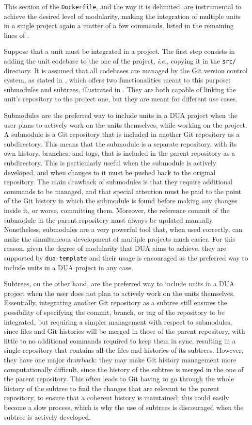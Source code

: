 This section of the \texttt{Dockerfile}, and the way it is delimited, are instrumental to achieve the desired level of modularity, making the integration of multiple units in a single project again a matter of a few commands, listed in the remaining lines of .

Suppose that a unit must be integrated in a project. The first step consists in adding the unit codebase to the one of the project, \emph{i.e.}, copying it in the \texttt{src/} directory. It is assumed that all codebases are managed by the Git version control system, as stated in , which offers two functionalities meant to this purpose: submodules and subtrees, illustrated in . They are both capable of linking the unit's repository to the project one, but they are meant for different use cases.

Submodules are the preferred way to include units in a DUA project when the user plans to actively work on the units themselves, while working on the project. A submodule is a Git repository that is included in another Git repository as a subdirectory. This means that the submodule is a separate repository, with its own history, branches, and tags, that is included in the parent repository as a subdirectory. This is particularly useful when the submodule is actively developed, and when changes to it must be pushed back to the original repository. The main drawback of submodules is that they require additional commands to be managed, and that special attention must be paid to the point of the Git history in which the submodule is found before making any changes inside it, or worse, committing them. Moreover, the reference commit of the submodule in the parent repository must always be updated manually. Nonetheless, submodules are a very powerful tool that, when used correctly, can make the simultaneous development of multiple projects much easier. For this reason, given the degree of modularity that DUA aims to achieve, they are supported by \texttt{dua-template} and their usage is encouraged as the preferred way to include units in a DUA project in any case.

Subtrees, on the other hand, are the preferred way to include units in a DUA project when the user does not plan to actively work on the units themselves. Essentially, integrating another Git repository as a subtree still ensures the possibility of specifying the commit, branch, or tag of the repository to be integrated, but requiring a simpler management with respect to submodules, since files and Git histories will be merged in those of the parent repository, with little to no additional commands required to keep them in sync, resulting in a single repository that contains all the files and histories of its subtrees. However, they have one major drawback: they may make Git history management more computationally difficult, since the history of the subtree is merged in the one of the parent repository. This often leads to Git having to go through the whole history of the subtree to find the changes that are relevant to the parent repository, to ensure that a coherent history is maintained; this could easily become a slow process, which is why the use of subtrees is discouraged when the subtree is actively developed.

